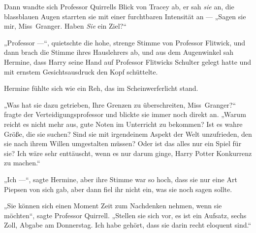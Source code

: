 Dann wandte sich Professor Quirrells Blick von Tracey ab, er sah \emph{sie} an, die blassblauen Augen starrten sie mit einer furchtbaren Intensität an —
„Sagen sie mir, Miss~Granger. Haben \emph{Sie} ein Ziel?“

„Professor —“, quietschte die hohe, strenge Stimme von Professor Flitwick, und dann brach die Stimme ihres Hauslehrers ab, und aus dem Augenwinkel sah Hermine, dass Harry seine Hand auf Professor Flitwicks Schulter gelegt hatte und mit ernstem Gesichtsausdruck den Kopf schüttelte.

Hermine fühlte sich wie ein Reh, das im Scheinwerferlicht stand.

„Was hat sie dazu getrieben, Ihre Grenzen zu überschreiten, Miss~Granger?“ fragte der Verteidigungsprofessor und blickte sie immer noch direkt an.
„Warum reicht es nicht mehr aus, gute Noten im Unterricht zu bekommen? Ist es wahre Größe, die sie suchen? Sind sie mit irgendeinem Aspekt der Welt unzufrieden, den sie nach ihrem Willen umgestalten müssen? Oder ist das alles nur ein Spiel für sie? Ich wäre sehr enttäuscht, wenn es nur darum ginge, Harry Potter Konkurrenz zu machen.“

„Ich —“, sagte Hermine, aber ihre Stimme war so hoch, dass sie nur eine Art Piepsen von sich gab, aber dann fiel ihr nicht ein, was sie noch sagen sollte.

„Sie können sich einen Moment Zeit zum Nachdenken nehmen, wenn sie möchten“, sagte Professor Quirrell.
„Stellen sie sich vor, es ist ein Aufsatz, sechs Zoll, Abgabe am Donnerstag. Ich habe gehört, dass sie darin recht eloquent sind.“

